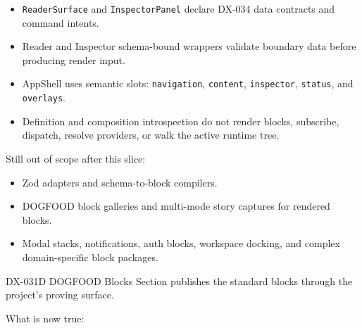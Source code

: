 \begin{itemize}
\item
  \texttt{R\allowbreak{}e\allowbreak{}a\allowbreak{}d\allowbreak{}e\allowbreak{}r\allowbreak{}S\allowbreak{}u\allowbreak{}r\allowbreak{}f\allowbreak{}a\allowbreak{}c\allowbreak{}e} and \texttt{I\allowbreak{}n\allowbreak{}s\allowbreak{}p\allowbreak{}e\allowbreak{}c\allowbreak{}t\allowbreak{}o\allowbreak{}r\allowbreak{}P\allowbreak{}a\allowbreak{}n\allowbreak{}e\allowbreak{}l} declare DX-034 data contracts and command intents.
\item
  Reader and Inspector schema-bound wrappers validate boundary data before producing render input.
\item
  AppShell uses semantic slots: \texttt{n\allowbreak{}a\allowbreak{}v\allowbreak{}i\allowbreak{}g\allowbreak{}a\allowbreak{}t\allowbreak{}i\allowbreak{}o\allowbreak{}n}, \texttt{c\allowbreak{}o\allowbreak{}n\allowbreak{}t\allowbreak{}e\allowbreak{}n\allowbreak{}t}, \texttt{i\allowbreak{}n\allowbreak{}s\allowbreak{}p\allowbreak{}e\allowbreak{}c\allowbreak{}t\allowbreak{}o\allowbreak{}r}, \texttt{s\allowbreak{}t\allowbreak{}a\allowbreak{}t\allowbreak{}u\allowbreak{}s}, and \texttt{o\allowbreak{}v\allowbreak{}e\allowbreak{}r\allowbreak{}l\allowbreak{}a\allowbreak{}y\allowbreak{}s}.
\item
  Definition and composition introspection do not render blocks, subscribe, dispatch, resolve providers, or walk the active runtime tree.
\end{itemize}

Still out of scope after this slice:

\begin{itemize}
\tightlist
\item
  Zod adapters and schema-to-block compilers.
\item
  DOGFOOD block galleries and multi-mode story captures for rendered blocks.
\item
  Modal stacks, notifications, auth blocks, workspace docking, and complex domain-specific block packages.
\end{itemize}

DX-031D DOGFOOD Blocks Section publishes the standard blocks through the project's proving surface.

What is now true:

